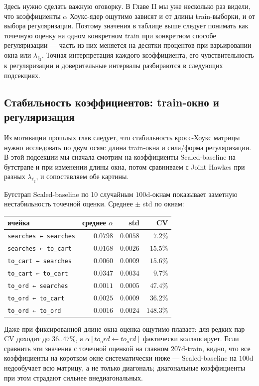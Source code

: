 \documentclass[12pt,a4paper]{article}
\begin{document}
Здесь нужно сделать важную оговорку. В Главе II мы уже несколько раз видели, что коэффициенты $\alpha $ Хоукс-ядер ощутимо зависят и от длины train-выборки, и от выбора регуляризации. Поэтому значения в таблице выше следует понимать как точечную оценку на одном конкретном train при конкретном способе регуляризации --- часть из них меняется на десятки процентов при варьировании окна или $\lambda _{\ell_2}$. Точная интерпретация каждого коэффициента, его чувствительность к регуляризации и доверительные интервалы разбираются в следующих подсекциях.

\FloatBarrier
\subsection{Стабильность коэффициентов: train-окно и регуляризация}

Из мотивации прошлых глав следует, что стабильность кросс-Хоукс матрицы нужно исследовать по двум осям: длина train-окна и сила/форма регуляризации. В этой подсекции мы сначала смотрим на коэффициенты Scaled-baseline на бутстрапе и при изменении длины окна, потом сравниваем с Joint Hawkes при разных $\lambda _{\ell_2}$, и сопоставляем обе картины.

Бутстрап Scaled-baseline по 10 случайным $100\text{d}$-окнам показывает заметную нестабильность точечной оценки. Среднее $\pm$ std по окнам:


\begin{table}[ht]
\centering
\small
\begin{tabular}{lrrr}
\toprule
ячейка & среднее $\alpha $ & std & CV \\
\midrule
\texttt{searches ← searches} & $0.0798$ & $0.0058$ & $7.2\%$ \\
\texttt{searches ← to\_cart} & $0.0168$ & $0.0026$ & $15.5\%$ \\
\texttt{to\_cart ← searches} & $0.0060$ & $0.0009$ & $15.6\%$ \\
\texttt{to\_cart ← to\_cart} & $0.0347$ & $0.0034$ & $9.7\%$ \\
\texttt{to\_ord ← searches} & $0.0011$ & $0.0005$ & $47.4\%$ \\
\texttt{to\_ord ← to\_cart} & $0.0025$ & $0.0009$ & $36.2\%$ \\
\texttt{to\_ord ← to\_ord} & $0.0016$ & $0.0024$ & $148.3\%$ \\
\bottomrule
\end{tabular}
\end{table}


Даже при фиксированной длине окна оценка ощутимо плавает: для редких пар CV доходит до $36..47\%$, а $\alpha [to_ord \leftarrow  to_ord]$ фактически коллапсирует. Если сравнить эти значения с точечной оценкой на главном $207\text{d}$-train, видно, что все коэффициенты на коротком окне систематически ниже --- Scaled-baseline на $100\text{d}$ недообучает всю матрицу, а не только диагональ; диагональные коэффициенты при этом страдают сильнее внедиагональных.
\end{document}
